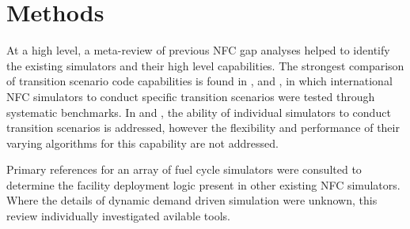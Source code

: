 \section{Methods}
At a high level, a meta-review of previous \gls{NFC} gap analyses 
helped to identify the existing simulators and their high 
level capabilities. The strongest comparison of transition scenario code 
capabilities is found in \cite{boucher_international_2010}, 
\cite{brown_identification_2016} and \cite{mccarthy_benchmark_2012}, in which 
international \gls{NFC} simulators to conduct specific transition scenarios 
were tested through systematic benchmarks. In 
\cite{carre_overview_2009} and \cite{hoffman_expanded_2016}, the ability of individual 
simulators to conduct transition scenarios is addressed, however the 
flexibility and performance of their varying algorithms for this capability are 
not addressed.

Primary references for an array of fuel cycle simulators were consulted to 
determine the facility deployment logic present in other existing
\gls{NFC} simulators. Where the details of dynamic demand driven 
simulation were unknown, this review individually investigated avilable tools. 

